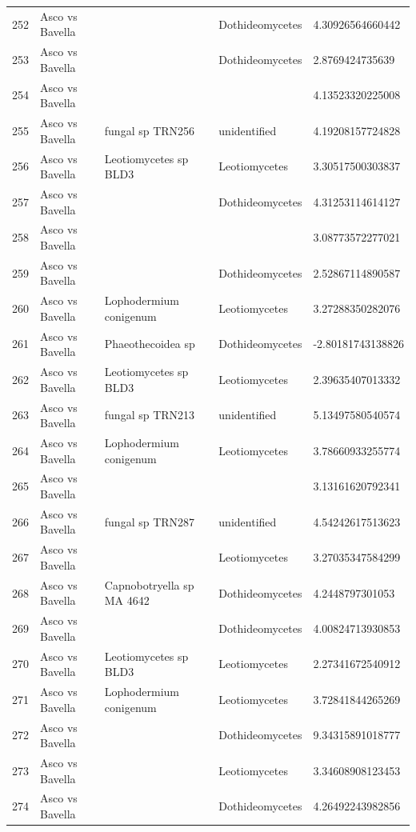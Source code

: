\documentclass[12pt]{article}\usepackage[]{graphicx}\usepackage[]{color}
\numberwithin{figure}{section}
\begin{document}
\begin{table}[ht]
\begin{tabular}{lllll}
  252 & Asco vs Bavella &  & Dothideomycetes & 4.30926564660442 \\ 
  253 & Asco vs Bavella &  & Dothideomycetes & 2.8769424735639 \\ 
  254 & Asco vs Bavella &  &  & 4.13523320225008 \\ 
  255 & Asco vs Bavella & fungal sp TRN256 & unidentified & 4.19208157724828 \\ 
  256 & Asco vs Bavella & Leotiomycetes sp BLD3 & Leotiomycetes & 3.30517500303837 \\ 
  257 & Asco vs Bavella &  & Dothideomycetes & 4.31253114614127 \\ 
  258 & Asco vs Bavella &  &  & 3.08773572277021 \\ 
  259 & Asco vs Bavella &  & Dothideomycetes & 2.52867114890587 \\ 
  260 & Asco vs Bavella & Lophodermium conigenum & Leotiomycetes & 3.27288350282076 \\ 
  261 & Asco vs Bavella & Phaeothecoidea sp & Dothideomycetes & -2.80181743138826 \\ 
  262 & Asco vs Bavella & Leotiomycetes sp BLD3 & Leotiomycetes & 2.39635407013332 \\ 
  263 & Asco vs Bavella & fungal sp TRN213 & unidentified & 5.13497580540574 \\ 
  264 & Asco vs Bavella & Lophodermium conigenum & Leotiomycetes & 3.78660933255774 \\ 
  265 & Asco vs Bavella &  &  & 3.13161620792341 \\ 
  266 & Asco vs Bavella & fungal sp TRN287 & unidentified & 4.54242617513623 \\ 
  267 & Asco vs Bavella &  & Leotiomycetes & 3.27035347584299 \\ 
  268 & Asco vs Bavella & Capnobotryella sp MA 4642 & Dothideomycetes & 4.2448797301053 \\ 
  269 & Asco vs Bavella &  & Dothideomycetes & 4.00824713930853 \\ 
  270 & Asco vs Bavella & Leotiomycetes sp BLD3 & Leotiomycetes & 2.27341672540912 \\ 
  271 & Asco vs Bavella & Lophodermium conigenum & Leotiomycetes & 3.72841844265269 \\ 
  272 & Asco vs Bavella &  & Dothideomycetes & 9.34315891018777 \\ 
  273 & Asco vs Bavella &  & Leotiomycetes & 3.34608908123453 \\ 
  274 & Asco vs Bavella &  & Dothideomycetes & 4.26492243982856 \\ 

\end{tabular}
\end{table}
\end{document}
